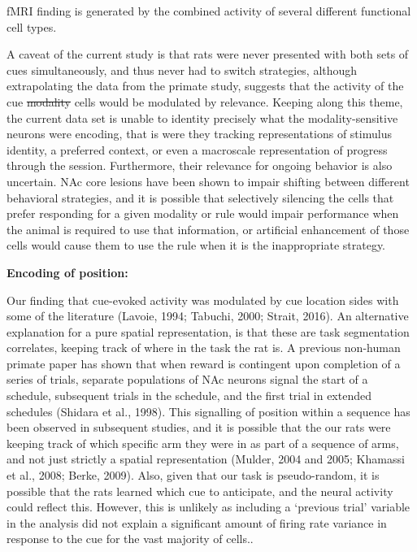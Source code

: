 \documentclass[11pt]{article}
\providecommand{\DIFadd}[1]{{\protect\color{blue}\uwave{#1}}} %
\providecommand{\DIFdel}[1]{{\protect\color{red}\sout{#1}}}                      %
\providecommand{\DIFaddbegin}{} %
\providecommand{\DIFaddend}{} %
\providecommand{\DIFdelbegin}{} %
\providecommand{\DIFdelend}{} %
\newcommand{\DIFscaledelfig}{0.5}
\newlength{\DIFdelgraphicswidth} %
\newlength{\DIFdelgraphicsheight} %
\newcommand{\DIFaddincludegraphics}[2][]{{\color{blue}\fbox{\DIFOincludegraphics[#1]{#2}}}} %
\newcommand{\DIFdelincludegraphics}[2][]{%
\sbox{\DIFdelgraphicsbox}{\DIFOincludegraphics[#1]{#2}}%
\settoboxwidth{\DIFdelgraphicswidth}{\DIFdelgraphicsbox} %
\settoboxtotalheight{\DIFdelgraphicsheight}{\DIFdelgraphicsbox} %
\scalebox{\DIFscaledelfig}{%
\parbox[b]{\DIFdelgraphicswidth}{\usebox{\DIFdelgraphicsbox}\\[-\baselineskip] \rule{\DIFdelgraphicswidth}{0em}}\llap{\resizebox{\DIFdelgraphicswidth}{\DIFdelgraphicsheight}{%
\setlength{\unitlength}{\DIFdelgraphicswidth}%
\begin{picture}(1,1)%
\thicklines\linethickness{2pt} %
{\color[rgb]{1,0,0}\put(0,0){\framebox(1,1){}}}%
{\color[rgb]{1,0,0}\put(0,0){\line( 1,1){1}}}%
{\color[rgb]{1,0,0}\put(0,1){\line(1,-1){1}}}%
\end{picture}%
}\hspace*{3pt}}} %
} %
\DeclareRobustCommand{\DIFaddbegin}{\DIFOaddbegin \let\includegraphics\DIFaddincludegraphics} %
\DeclareRobustCommand{\DIFaddend}{\DIFOaddend \let\includegraphics\DIFOincludegraphics} %
\DeclareRobustCommand{\DIFdelbegin}{\DIFOdelbegin \let\includegraphics\DIFdelincludegraphics} %
\DeclareRobustCommand{\DIFdelend}{\DIFOaddend \let\includegraphics\DIFOincludegraphics} %
\begin{document}
fMRI finding is generated by the combined activity of several different functional cell types.

A caveat of the current study is that rats were never presented with both sets of cues simultaneously, and thus never had to switch strategies, although extrapolating the data from the primate study, suggests that the activity of the cue \DIFdelbegin \DIFdel{modality }\DIFdelend \DIFaddbegin \DIFadd{identity }\DIFaddend cells would be modulated by relevance. Keeping along this theme, the current data set is unable to identity precisely what the modality-sensitive neurons were encoding, that is were they tracking representations of stimulus identity, a preferred context, or even a macroscale representation of progress through the session. Furthermore, their relevance for ongoing behavior is also uncertain. NAc core lesions have been shown to impair shifting between different behavioral strategies, and it is possible that selectively silencing the cells that prefer responding for a given modality or rule would impair performance when the animal is required to use that information, or artificial enhancement of those cells would cause them to use the rule when it is the inappropriate strategy.

{\bf Encoding of position:}

Our finding that cue-evoked activity was modulated by cue location sides with some of the literature (Lavoie, 1994; Tabuchi, 2000; Strait, 2016). An alternative explanation for a pure spatial representation, is that these are task segmentation correlates, keeping track of where in the task the rat is. A previous non-human primate paper has shown that when reward is contingent upon completion of a series of trials, separate populations of NAc neurons signal the start of a schedule, subsequent trials in the schedule, and the first trial in extended schedules (Shidara et al., 1998). This signalling of position within a sequence has been observed in subsequent studies, and it is possible that the our rats were keeping track of which specific arm they were in as part of a sequence of arms, and not just strictly a spatial representation (Mulder, 2004 and 2005; Khamassi et al., 2008; Berke, 2009). Also, given that our task is pseudo-random, it is possible that the rats learned which cue to anticipate, and the neural activity could reflect this. However, this is unlikely as including a ‘previous trial’ variable in the analysis did not explain a significant amount of firing rate variance in response to the cue for the vast majority of cells..
\end{document}
